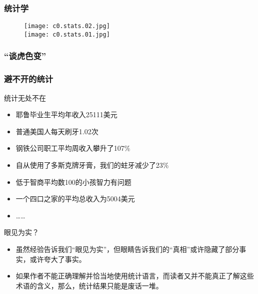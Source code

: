 \begin{frame}
  \frametitle{统计学}
  \begin{figure}
    \centering
    \texttt{[image: c0.stats.02.jpg]}\\
    \texttt{[image: c0.stats.01.jpg]}
  \end{figure}
\end{frame}

\begin{frame}
  \frametitle{“谈虎色变”}
  \begin{figure}
    \centering
  \end{figure}
\end{frame}

\begin{frame}[fragile]
  \frametitle{避不开的统计}
  \begin{block}{统计无处不在}
    \begin{itemize}
      \item 耶鲁毕业生平均年收入25111美元 
      \item 普通美国人每天刷牙1.02次
      \item 钢铁公司职工平均周收入攀升了107\%
      \item 自从使用了多斯克牌牙膏，我们的蛀牙减少了23\%
      \item 低于智商平均数100的小孩智力有问题
      \item 一个四口之家的平均总收入为5004美元
      \item ……
    \end{itemize}
  \end{block}
  \pause
  \begin{block}{眼见为实？}
    \begin{itemize}
      \item 虽然经验告诉我们“眼见为实”，但眼睛告诉我们的“真相”或许隐藏了部分事实，或许夸大了事实。
      \item 如果作者不能正确理解并恰当地使用统计语言，而读者又并不能真正了解这些术语的含义，那么，统计结果只能是废话一堆。
    \end{itemize}
  \end{block}
\end{frame}

